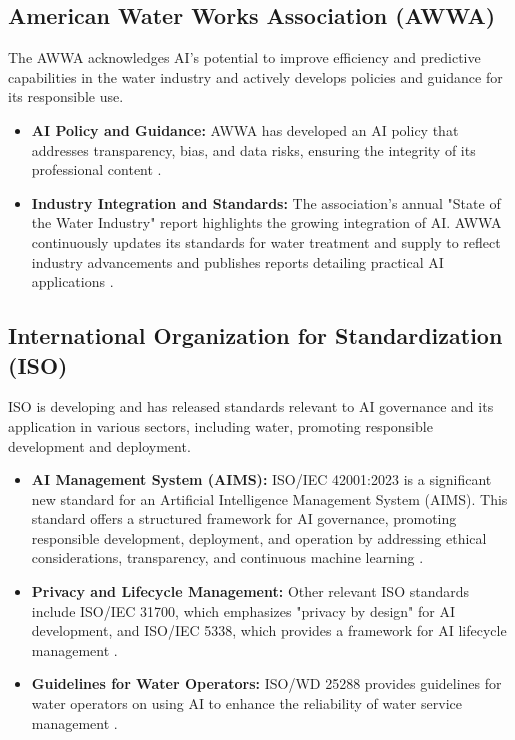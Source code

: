 \subsection{American Water Works Association (AWWA)}
The AWWA acknowledges AI's potential to improve efficiency and predictive capabilities in the water industry and actively develops policies and guidance for its responsible use.
\begin{itemize}
    \item \textbf{AI Policy and Guidance:} AWWA has developed an AI policy that addresses transparency, bias, and data risks, ensuring the integrity of its professional content \cite{WaterOnline_AWWA, AWWA_AI_Policy}.
    \item \textbf{Industry Integration and Standards:} The association's annual "State of the Water Industry" report highlights the growing integration of AI. AWWA continuously updates its standards for water treatment and supply to reflect industry advancements and publishes reports detailing practical AI applications \cite{BritishWaterFilter_AWWA, AWWA_StateOfIndustry}.
\end{itemize}

\subsection{International Organization for Standardization (ISO)}
ISO is developing and has released standards relevant to AI governance and its application in various sectors, including water, promoting responsible development and deployment.
\begin{itemize}
    \item \textbf{AI Management System (AIMS):} ISO/IEC 42001:2023 is a significant new standard for an Artificial Intelligence Management System (AIMS). This standard offers a structured framework for AI governance, promoting responsible development, deployment, and operation by addressing ethical considerations, transparency, and continuous machine learning \cite{ISME_ISO, KPMG_ISO}.
    \item \textbf{Privacy and Lifecycle Management:} Other relevant ISO standards include ISO/IEC 31700, which emphasizes "privacy by design" for AI development, and ISO/IEC 5338, which provides a framework for AI lifecycle management \cite{SoftwareImprovementGroup_ISO, Kiwa_ISO}.
    \item \textbf{Guidelines for Water Operators:} ISO/WD 25288 provides guidelines for water operators on using AI to enhance the reliability of water service management \cite{WaldenEnvironmentalEngineering_ISO}.
\end{itemize}


